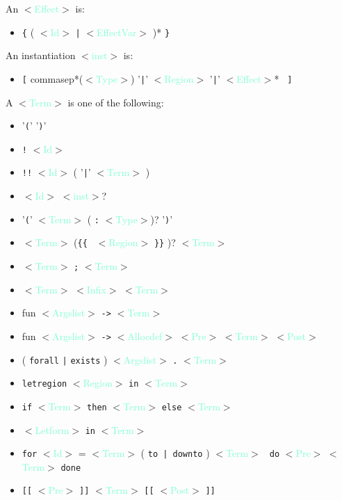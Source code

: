 \documentclass[a4paper]{scrreprt}
\newcommand{\cat}[1]{$<$\textcolor{Aquamarine}{#1}$>$}
\begin{document}
An \cat{Effect} is: 
\begin{itemize}
  \item {\tt \{} ( \cat{Id} {\tt |} \cat{EffectVar} )* {\tt \}}
\end{itemize}

An instantiation \cat{inst} is:
\begin{itemize}
  \item {\tt [} commasep*(\cat{Type}) '{\tt |}' \cat{Region} '{\tt |}' \cat{Effect}* {\tt
    ]}
\end{itemize}
  

A \cat{Term} is one of the following:
\begin{itemize}
  \item '{\tt (}' '{\tt )}'
  \item {\tt !} \cat{Id}
  \item {\tt !!} \cat{Id} ( '{\tt |}' \cat{Term} )
  \item \cat{Id} \cat{inst}?
  \item '{\tt (}' \cat{Term} ( {\tt :} \cat{Type})? '{\tt )}'
  \item \cat{Term} ({\tt \{\{ } \cat{Region} {\tt \}\}} )? \cat{Term} 
  \item \cat{Term} {\tt ;} \cat{Term} 
  \item \cat{Term} \cat{Infix} \cat{Term}
  \item fun \cat{Argslist} {\tt ->} \cat{Term}
  \item fun \cat{Argslist} {\tt ->} \cat{Allocdef} {\cat{Pre}} \cat{Term} {\cat{Post}}
  \item ( {\tt forall} {\tt |} {\tt exists} ) \cat{Argslist} {\tt .} \cat{Term}
  \item {\tt letregion} \cat{Region} {\tt in} \cat{Term}
  \item {\tt if} \cat{Term} {\tt then} \cat{Term} {\tt else} \cat{Term}
  \item \cat{Letform} {\tt in} \cat{Term}
  \item {\tt for} \cat{Id} = \cat{Term} ( {\tt to | downto} ) \cat{Term} {\tt
    do} {\cat{Pre}} \cat{Term} {\tt done}
  \item {\tt [[} \cat{Pre} {\tt ]]} \cat{Term} {\tt [[} \cat{Post} {\tt ]]}
\end{itemize}
\end{document}
